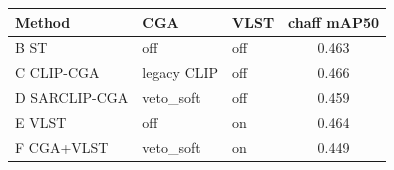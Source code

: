\begin{tabular}{lllc}
\toprule
Method & CGA & VLST & chaff mAP50 \\
\midrule
B ST & off & off & 0.463 \\
C CLIP-CGA & legacy CLIP & off & 0.466 \\
D SARCLIP-CGA & veto\_soft & off & 0.459 \\
E VLST & off & on & 0.464 \\
F CGA+VLST & veto\_soft & on & 0.449 \\
\bottomrule
\end{tabular}
